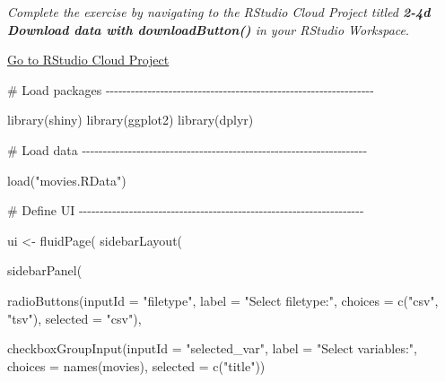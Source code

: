 \documentclass[
  letterpaper,
  DIV=11,
  numbers=noendperiod]{scrreprt}
\newenvironment{Shaded}{\begin{snugshade}}{\end{snugshade}}
\newcommand{\AttributeTok}[1]{\textcolor[rgb]{0.40,0.46,0.14}{#1}}
\newcommand{\CommentTok}[1]{\textcolor[rgb]{0.37,0.37,0.37}{#1}}
\newcommand{\FunctionTok}[1]{\textcolor[rgb]{0.28,0.35,0.67}{#1}}
\newcommand{\NormalTok}[1]{\textcolor[rgb]{0.00,0.46,0.62}{#1}}
\newcommand{\OtherTok}[1]{\textcolor[rgb]{0.00,0.46,0.62}{#1}}
\newcommand{\StringTok}[1]{\textcolor[rgb]{0.13,0.47,0.30}{#1}}
\begin{document}
\emph{Complete the exercise by navigating to the RStudio Cloud Project
titled \textbf{2-4d Download data with downloadButton()} in your RStudio
Workspace}.

\href{https://rstudio.cloud/spaces/81721/join?access_code=I4VJaNsKfTqR3Td9hLP7E1nz8\%2FtMg6Xbw9Bgqumv}{
Go to RStudio Cloud Project}

\begin{Shaded}
\begin{Highlighting}[]
\CommentTok{\# Load packages {-}{-}{-}{-}{-}{-}{-}{-}{-}{-}{-}{-}{-}{-}{-}{-}{-}{-}{-}{-}{-}{-}{-}{-}{-}{-}{-}{-}{-}{-}{-}{-}{-}{-}{-}{-}{-}{-}{-}{-}{-}{-}{-}{-}{-}{-}{-}{-}{-}{-}{-}{-}{-}{-}{-}{-}{-}{-}{-}{-}{-}{-}{-}{-}}

\FunctionTok{library}\NormalTok{(shiny)}
\FunctionTok{library}\NormalTok{(ggplot2)}
\FunctionTok{library}\NormalTok{(dplyr)}

\CommentTok{\# Load data {-}{-}{-}{-}{-}{-}{-}{-}{-}{-}{-}{-}{-}{-}{-}{-}{-}{-}{-}{-}{-}{-}{-}{-}{-}{-}{-}{-}{-}{-}{-}{-}{-}{-}{-}{-}{-}{-}{-}{-}{-}{-}{-}{-}{-}{-}{-}{-}{-}{-}{-}{-}{-}{-}{-}{-}{-}{-}{-}{-}{-}{-}{-}{-}{-}{-}{-}{-}}

\FunctionTok{load}\NormalTok{(}\StringTok{"movies.RData"}\NormalTok{)}

\CommentTok{\# Define UI {-}{-}{-}{-}{-}{-}{-}{-}{-}{-}{-}{-}{-}{-}{-}{-}{-}{-}{-}{-}{-}{-}{-}{-}{-}{-}{-}{-}{-}{-}{-}{-}{-}{-}{-}{-}{-}{-}{-}{-}{-}{-}{-}{-}{-}{-}{-}{-}{-}{-}{-}{-}{-}{-}{-}{-}{-}{-}{-}{-}{-}{-}{-}{-}{-}{-}{-}{-}}

\NormalTok{ui }\OtherTok{\textless{}{-}} \FunctionTok{fluidPage}\NormalTok{(}
  \FunctionTok{sidebarLayout}\NormalTok{(}
    
    \FunctionTok{sidebarPanel}\NormalTok{(}
      
      \FunctionTok{radioButtons}\NormalTok{(}\AttributeTok{inputId =} \StringTok{"filetype"}\NormalTok{,}
                   \AttributeTok{label =} \StringTok{"Select filetype:"}\NormalTok{,}
                   \AttributeTok{choices =} \FunctionTok{c}\NormalTok{(}\StringTok{"csv"}\NormalTok{, }\StringTok{"tsv"}\NormalTok{),}
                   \AttributeTok{selected =} \StringTok{"csv"}\NormalTok{),}
      
      \FunctionTok{checkboxGroupInput}\NormalTok{(}\AttributeTok{inputId =} \StringTok{"selected\_var"}\NormalTok{,}
                         \AttributeTok{label =} \StringTok{"Select variables:"}\NormalTok{,}
                         \AttributeTok{choices =} \FunctionTok{names}\NormalTok{(movies),}
                         \AttributeTok{selected =} \FunctionTok{c}\NormalTok{(}\StringTok{"title"}\NormalTok{))}
      

\end{Highlighting}
\end{Shaded}
\end{document}
